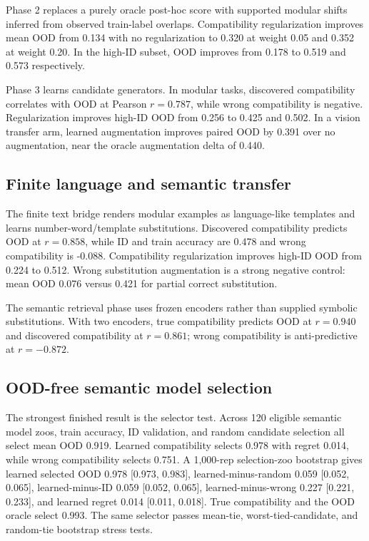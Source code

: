 \documentclass[10pt,twocolumn]{article}
\begin{document}
Phase 2 replaces a purely oracle post-hoc score with supported modular shifts
inferred from observed train-label overlaps. Compatibility regularization
improves mean OOD from 0.134 with no regularization to 0.320 at weight 0.05 and
0.352 at weight 0.20. In the high-ID subset, OOD improves from 0.178 to 0.519
and 0.573 respectively.

Phase 3 learns candidate generators. In modular tasks, discovered compatibility
correlates with OOD at Pearson $r=0.787$, while wrong compatibility is negative.
Regularization improves high-ID OOD from 0.256 to 0.425 and 0.502. In a vision
transfer arm, learned augmentation improves paired OOD by 0.391 over no
augmentation, near the oracle augmentation delta of 0.440.

\subsection{Finite language and semantic transfer}

The finite text bridge renders modular examples as language-like templates and
learns number-word/template substitutions. Discovered compatibility predicts
OOD at $r=0.858$, while ID and train accuracy are 0.478 and wrong compatibility
is -0.088. Compatibility regularization improves high-ID OOD from 0.224 to
0.512. Wrong substitution augmentation is a strong negative control: mean OOD
0.076 versus 0.421 for partial correct substitution.

The semantic retrieval phase uses frozen encoders rather than supplied symbolic
substitutions. With two encoders, true compatibility predicts OOD at $r=0.940$
and discovered compatibility at $r=0.861$; wrong compatibility is
anti-predictive at $r=-0.872$.

\subsection{OOD-free semantic model selection}

The strongest finished result is the selector test. Across 120 eligible semantic
model zoos, train accuracy, ID validation, and random candidate selection all
select mean OOD 0.919. Learned compatibility selects 0.978 with regret 0.014,
while wrong compatibility selects 0.751. A 1,000-rep selection-zoo bootstrap
gives learned selected OOD 0.978 [0.973, 0.983], learned-minus-random 0.059
[0.052, 0.065], learned-minus-ID 0.059 [0.052, 0.065], learned-minus-wrong
0.227 [0.221, 0.233], and learned regret 0.014 [0.011, 0.018]. True
compatibility and the OOD oracle select 0.993. The same selector passes
mean-tie, worst-tied-candidate, and random-tie bootstrap stress tests.
\end{document}
